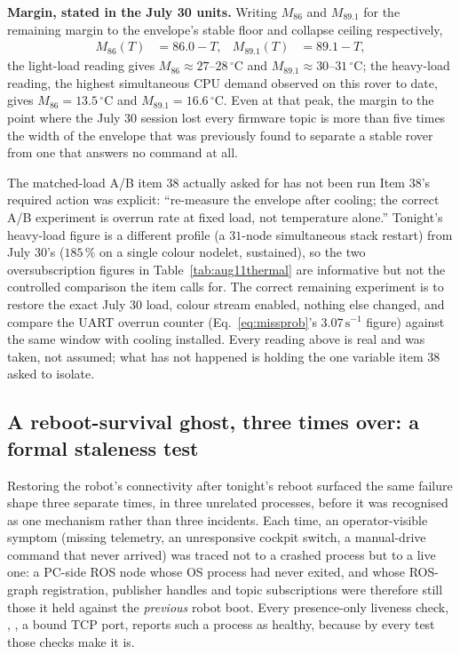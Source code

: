 \noindent\textbf{Margin, stated in the July 30 units.} Writing $M_{86}$ and
$M_{89.1}$ for the remaining margin to the envelope's stable floor and
collapse ceiling respectively,
\begin{align}
M_{86}(T)   &= 86.0 - T, &
M_{89.1}(T) &= 89.1 - T,
\label{eq:thermalmargin}
\end{align}
the light-load reading gives $M_{86} \approx 27$--$28\,^\circ$C and
$M_{89.1} \approx 30$--$31\,^\circ$C; the heavy-load reading, the highest
simultaneous CPU demand observed on this rover to date, gives
$M_{86} = 13.5\,^\circ$C and $M_{89.1} = 16.6\,^\circ$C. Even at that peak,
the margin to the point where the July 30 session lost every firmware topic
is more than five times the width of the envelope that was previously
found to separate a stable rover from one that answers no command at all.

\begin{trapbox}{The matched-load A/B item 38 actually asked for has not been run}
Item 38's required action was explicit: ``re-measure the envelope after
cooling; the correct A/B experiment is overrun rate at fixed load, not
temperature alone.'' Tonight's heavy-load figure is a different profile
(a $31$-node simultaneous stack restart) from July 30's ($185\,\%$ on a
single colour nodelet, sustained), so the two oversubscription figures in
Table~\ref{tab:aug11thermal} are informative but not the controlled
comparison the item calls for. The correct remaining experiment is to
restore the exact July 30 load, colour stream enabled, nothing else changed,
and compare the UART overrun counter (Eq.~\ref{eq:missprob}'s
$3.07\,\mathrm{s}^{-1}$ figure) against the same window with cooling
installed. Every reading above is real and was taken, not assumed; what has
not happened is holding the one variable item 38 asked to isolate.
\end{trapbox}

\subsection{A reboot-survival ghost, three times over: a formal staleness test}
\label{sec:aug11stale}

Restoring the robot's connectivity after tonight's reboot surfaced the same
failure shape three separate times, in three unrelated processes, before it
was recognised as one mechanism rather than three incidents. Each time, an
operator-visible symptom (missing telemetry, an unresponsive cockpit switch,
a manual-drive command that never arrived) was traced not to a crashed
process but to a live one: a PC-side ROS node whose OS process had never
exited, and whose ROS-graph registration, publisher handles and topic
subscriptions were therefore still those it held against the \emph{previous}
robot boot. Every presence-only liveness check, , , a bound TCP port, reports such a process as healthy, because by every
test those checks make it is.

